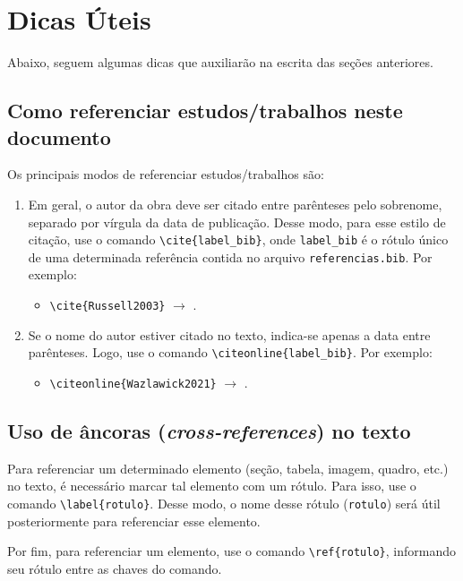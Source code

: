 \section{Dicas Úteis}

Abaixo, seguem algumas dicas que auxiliarão na escrita das seções anteriores.

\subsection{Como referenciar estudos/trabalhos neste documento}

Os principais modos de referenciar estudos/trabalhos são:
\begin{enumerate}[label=\roman*., nosep, leftmargin=2.5cm]
    \item Em geral, o autor da obra deve ser citado entre parênteses pelo sobrenome, separado por vírgula da data de publicação. Desse modo, para esse estilo de citação, use o comando \verb|\cite{label_bib}|, onde \texttt{label\_bib} é o rótulo único de uma determinada referência contida no arquivo \texttt{referencias.bib}. Por exemplo:
        \begin{itemize}
            \item \verb|\cite{Russell2003}| $\rightarrow$ \cite{Russell2003}.
        \end{itemize}
    \item Se o nome do autor estiver citado no texto, indica-se apenas a data entre parênteses. Logo, use o comando \verb|\citeonline{label_bib}|. Por exemplo:
        \begin{itemize}
            \item \verb|\citeonline{Wazlawick2021}| $\rightarrow$ .
        \end{itemize}
\end{enumerate}

\subsection{Uso de âncoras (\textit{cross-references}) no texto}

Para referenciar um determinado elemento (seção, tabela, imagem, quadro, etc.) no texto, é necessário marcar tal elemento com um rótulo. Para isso, use o comando \verb|\label{rotulo}|. Desse modo, o nome desse rótulo (\texttt{rotulo}) será útil posteriormente para referenciar esse elemento.

Por fim, para referenciar um elemento, use o comando \verb|\ref{rotulo}|, informando seu rótulo entre as chaves do comando.

